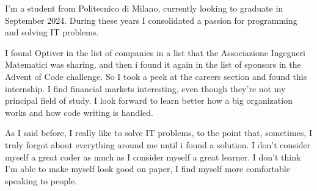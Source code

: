 \documentclass[11pt, a4paper]{awesome-cv} %
\begin{document}
\makecvheader %


\begin{cvletter}



I'm a student from Politecnico di Milano, currently looking to graduate in September 2024. During these years I consolidated a passion for programming and solving IT problems.


I found Optiver in the list of companies in a list that the Associazione Ingegneri Matematici was sharing, and then i found it again in the list of sponsors in the Advent of Code challenge. So I took a peek at the careers section and found this internship. I find financial markets interesting, even though they're not my principal field of study. I look forward to learn better how a big organization works and how code writing is handled.



As I said before, I really like to solve IT problems, to the point that, sometimes, I truly forgot about everything around me until i found a solution. I don't consider myself a great coder as much as I consider myself a great learner. I don't think I'm able to make myself look good on paper, I find myself more comfortable speaking to people.

\end{cvletter}


\makeletterclosing %
\end{document}
